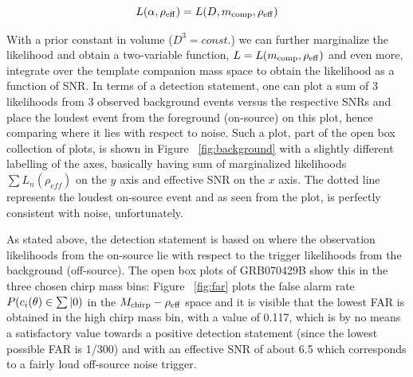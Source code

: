 \documentclass[epsf]{article}
\begin{document}
\begin{equation}
L({\bf \alpha}, \rho_{{\rm eff}}) = L(D, m_{{\rm comp}}, \rho_{{\rm eff}})
\end{equation}

With a prior constant in volume ($D^3=const.$) we can further marginalize the likelihood and obtain a two-variable function, $L=L(m_{{\rm comp}}, \rho_{{\rm eff}})$ and even more, integrate over the template companion mass space to obtain the likelihood as a function of SNR. In terms of a detection statement, one can plot a sum of 3 likelihoods from 3 observed background events versus the respective SNRs and place the loudest event from the foreground (on-source) on this plot, hence comparing where it lies with respect to noise. Such a plot, part of the open box collection of plots, is shown in Figure ~\ref{fig:background} with a slightly different labelling of the axes, basically having sum of marginalized likelihoods $\sum L_n(\rho_{eff})$ on the $y$ axis and effective SNR on the $x$ axis. The dotted line represents the loudest on-source event and as seen from the plot, is perfectly consistent with noise, unfortunately.

 As stated above, the detection statement is based on where the observation likelihoods from the on-source lie with respect to the trigger likelihoods from the background (off-source). The open box plots of GRB070429B show this in the three chosen chirp mass bins: Figure ~\ref{fig:far} plots the false alarm rate $P(c_i({\bf \theta}) \in \sum|0)$  in the $M_{{\rm chirp}}-\rho_{{\rm eff}}$ space and it is visible that the lowest FAR is obtained in the high chirp mass bin, with a value of 0.117, which is by no means a satisfactory value towards a positive detection statement (since the lowest possible FAR is 1/300) and with an effective SNR of about 6.5 which corresponds to a fairly loud off-source noise trigger.  
\end{document}
